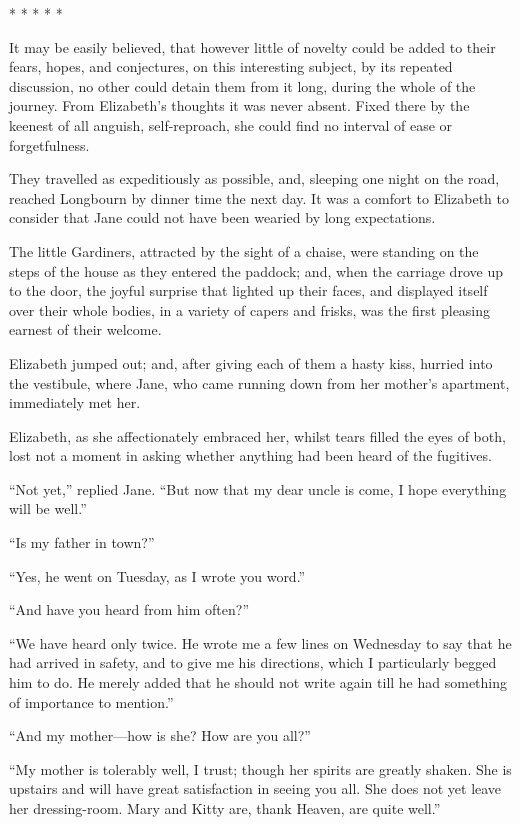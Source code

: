\begin{center}* * * * *\end{center}

It may be easily believed, that however little of novelty could be
added to their fears, hopes, and conjectures, on this interesting
subject, by its repeated discussion, no other could detain them
from it long, during the whole of the journey.  From Elizabeth's
thoughts it was never absent.  Fixed there by the keenest of all
anguish, self-reproach, she could find no interval of ease or
forgetfulness.

They travelled as expeditiously as possible, and, sleeping one
night on the road, reached Longbourn by dinner time the next
day.  It was a comfort to Elizabeth to consider that Jane could
not have been wearied by long expectations.

The little Gardiners, attracted by the sight of a chaise, were
standing on the steps of the house as they entered the paddock;
and, when the carriage drove up to the door, the joyful surprise
that lighted up their faces, and displayed itself over their whole
bodies, in a variety of capers and frisks, was the first pleasing
earnest of their welcome.

Elizabeth jumped out; and, after giving each of them a hasty
kiss, hurried into the vestibule, where Jane, who came running
down from her mother's apartment, immediately met her.

Elizabeth, as she affectionately embraced her, whilst tears filled
the eyes of both, lost not a moment in asking whether anything
had been heard of the fugitives.

``Not yet,'' replied Jane.  ``But now that my dear uncle is come,
I hope everything will be well.''

``Is my father in town?''

``Yes, he went on Tuesday, as I wrote you word.''

``And have you heard from him often?''

``We have heard only twice.  He wrote me a few lines on
Wednesday to say that he had arrived in safety, and to give me
his directions, which I particularly begged him to do.  He merely
added that he should not write again till he had something of
importance to mention.''

``And my mother---how is she?  How are you all?''

``My mother is tolerably well, I trust; though her spirits are
greatly shaken.  She is upstairs and will have great satisfaction
in seeing you all.  She does not yet leave her dressing-room.
Mary and Kitty are, thank Heaven, are quite well.''

